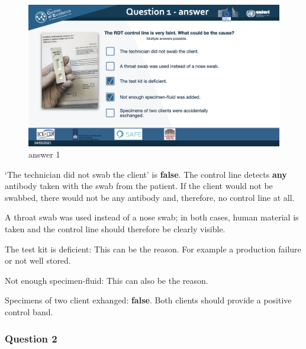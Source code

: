 \documentclass[
]{book}
\begin{document}
\begin{figure}
\centering
\includegraphics{images/m04/m04_questions_v3.002.jpeg}
\caption{answer 1}
\end{figure}

`The technician did not swab the client' is \textbf{false}. The control line detects \textbf{any} antibody taken with the swab from the patient. If the client would not be swabbed, there would not be any antibody and, therefore, no control line at all.

A throat swab was used instead of a nose swab; in both cases, human material is taken and the control line should therefore be clearly visible.

The test kit is deficient: This can be the reason. For example a production failure or not well stored.

Not enough specimen-fluid: This can also be the reason.

Specimens of two client exhanged: \textbf{false}. Both clients should provide a positive control band.

\hypertarget{question-2-2}{%
\subsubsection{Question 2}\label{question-2-2}}
\end{document}
